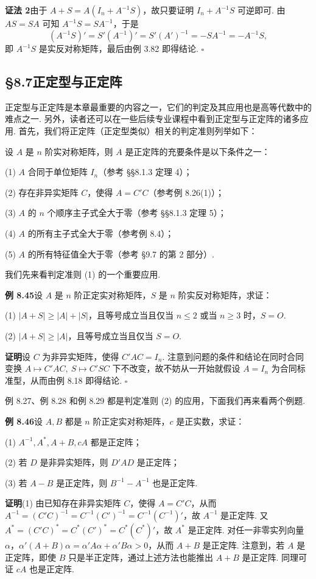 \documentclass[UTF8, 12pt, fontset=fandol, oneside]{ctexart}
\begin{document}
\noindent\textbf{证法 2}\quad 由于 $A+S=A(I_n+A^{-1}S)$，故只要证明 $I_n+A^{-1}S$ 可逆即可. 由 $AS=SA$ 可知 $A^{-1}S=SA^{-1}$，于是
\[
(A^{-1}S)'=S'(A^{-1})'=S'(A')^{-1}=-SA^{-1}=-A^{-1}S,
\]
即 $A^{-1}S$ 是实反对称矩阵，最后由例 3.82 即得结论. $\ensuremath{\square}$

\subsection*{§8.7\quad 正定型与正定阵}

正定型与正定阵是本章最重要的内容之一，它们的判定及其应用也是高等代数中的难点之一. 另外，读者还可以在一些后续专业课程中看到正定型与正定阵的诸多应用. 首先，我们将正定阵（正定型类似）相关的判定准则列举如下：

设 $A$ 是 $n$ 阶实对称矩阵，则 $A$ 是正定阵的充要条件是以下条件之一：

(1) $A$ 合同于单位矩阵 $I_n$（参考 §§8.1.3 定理 4）；

(2) 存在非异实矩阵 $C$，使得 $A=C'C$（参考例 8.26(1)）；

(3) $A$ 的 $n$ 个顺序主子式全大于零（参考 §§8.1.3 定理 5）；

(4) $A$ 的所有主子式全大于零（参考例 8.4）；

(5) $A$ 的所有特征值全大于零（参考 §9.7 的第 2 部分）.

我们先来看判定准则 (1) 的一个重要应用.

\noindent\textbf{例 8.45}\quad 设 $A$ 是 $n$ 阶正定实对称矩阵，$S$ 是 $n$ 阶实反对称矩阵，求证：

(1) $|A+S|\ge |A|+|S|$，且等号成立当且仅当 $n\le 2$ 或当 $n\ge 3$ 时，$S=O$.

(2) $|A+S|\ge |A|$，且等号成立当且仅当 $S=O$.

\noindent\textbf{证明}\quad 设 $C$ 为非异实矩阵，使得 $C'AC=I_n$. 注意到问题的条件和结论在同时合同变换 $A\mapsto C'AC,\ S\mapsto C'SC$ 下不改变，故不妨从一开始就假设 $A=I_n$ 为合同标准型，从而由例 8.18 即得结论. $\ensuremath{\square}$

例 8.27、例 8.28 和例 8.29 都是判定准则 (2) 的应用，下面我们再来看两个例题.

\noindent\textbf{例 8.46}\quad 设 $A,B$ 都是 $n$ 阶正定实对称矩阵，$c$ 是正实数，求证：

(1) $A^{-1},A^*,A+B,cA$ 都是正定阵；

(2) 若 $D$ 是非异实矩阵，则 $D'AD$ 是正定阵；

(3) 若 $A-B$ 是正定阵，则 $B^{-1}-A^{-1}$ 也是正定阵.

\noindent\textbf{证明}\quad (1) 由已知存在非异实矩阵 $C$，使得 $A=C'C$，从而 $A^{-1}=(C'C)^{-1}=C^{-1}(C')^{-1}=C^{-1}(C^{-1})'$，故 $A^{-1}$ 是正定阵. 又 $A^*=(C'C)^*=C^*(C')^*=C^*(C^*)'$，故 $A^*$ 是正定阵. 对任一非零实列向量 $\alpha$，$\alpha'(A+B)\alpha=\alpha'A\alpha+\alpha'B\alpha>0$，从而 $A+B$ 是正定阵. 注意到，若 $A$ 是正定阵，即使 $B$ 只是半正定阵，通过上述方法也能推出 $A+B$ 是正定阵. 同理可证 $cA$ 也是正定阵.
\end{document}

